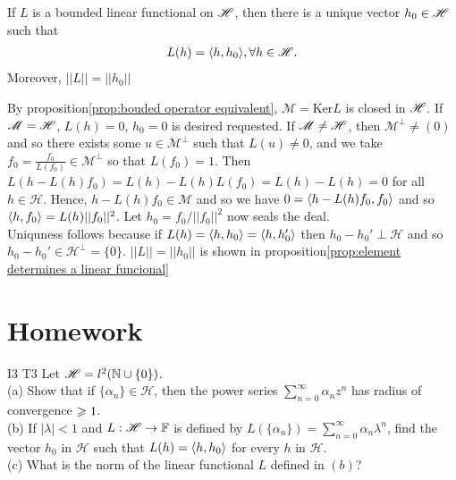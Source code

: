 \begin{theorem}{}{}
    If $L$ is a bounded linear functional on $\mathscr{H}$, then there is a unique vector $h_0\in\mathscr{H}$ such that
    \begin{align}
        L(h) = \langle h,h_0\rangle, \forall h\in \mathscr{H}.
    \end{align}
    Moreover, $||L||=||h_0||$
\end{theorem}

\begin{proofsolution}
    By proposition\ref{prop:bouded operator equivalent}, $\mathscr{M} = \text{Ker} L$ is closed in $\mathscr{H}$. If $\mathscr{M}=\mathscr{H}$, $L(h)=0$, $h_0=0$ is desired requested.
    If $\mathscr{M}\neq \mathscr{H}$, then $\mathscr{M}^{\perp}\neq (0)$ and 
    so there exists some $u\in\mathscr{M}^{\perp}$ such that $L(u)\neq 0$, 
    and we take $f_0=\frac{f_0}{L(f_0)}\in\mathscr{M}^{\perp}$ so that $L(f_0)=1$. 
    Then $L(h-L(h)f_0)=L(h)-L(h)L(f_0)=L(h)-L(h)=0$ for all $h\in\mathscr{H}$.
    Hence, $h-L(h)f_0\in\mathscr{M}$ and so we have
    $0=\langle h-L(h)f_0,f_0\rangle$ and so $\langle h,f_0\rangle=L(h)||f_0||^2$.
    Let $h_0 = f_0/||f_0||^2$ now seals the deal.\\
    Uniquness follows because if $L(h) = \langle h,h_0\rangle = \langle h,h_0'\rangle$
    then $h_0 - h_0'\perp \mathscr{H}$ and so $h_0 - h_0'\in\mathscr{H}^{\perp}=\{0\}$.
    $||L||=||h_0||$ is shown in proposition\ref{prop:element determines a linear funcional}
\end{proofsolution}


\section{Homework}

\begin{exercise}{I3 T3}{}
    Let $\mathscr{H}=l^2(\mathbb{N}\cup \{0\})$. \\
    (a) Show that if $\{\alpha_n\}\in \mathscr{H}$, then the power series $\sum\limits_{n=0}^{\infty} \alpha_n z^n$ 
    has radius of convergence $\geqslant 1$.\\
    (b) If $|\lambda|<1$ and $L:\mathscr{H}\rightarrow \mathbb{F}$ is defined by $L(\{\alpha_n\})=\sum\limits_{n=0}^{\infty}\alpha_n\lambda^n$, 
    find the vector $h_0$ in $\mathscr{H}$ such that $L(h)=\langle h,h_0\rangle$ for every $h$ in $\mathscr{H}$.\\
    (c) What is the norm of the linear functional $L$ defined in $(b)$?
\end{exercise}

